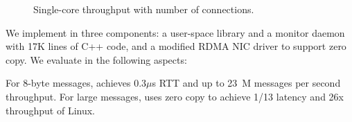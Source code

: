\begin{figure}[t!]
		\centering
		
		\caption{Single-core throughput with number of connections.}
		\label{socksdirect:fig:eval-connnum-tput}
\end{figure}


We implement \sys in three components: a user-space library \libipc{} and a monitor daemon with 17K lines of C++ code, and a modified RDMA NIC driver to support zero copy. We evaluate \sys in the following aspects:

For 8-byte messages, \sys achieves 0.3$\mu$s RTT and up to 23~M messages per second throughput. For large messages, \sys uses zero copy to achieve 1/13 latency and 26x throughput of Linux.

